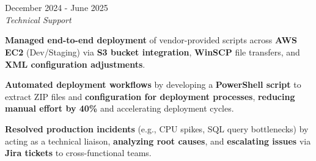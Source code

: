 \documentclass[../main.tex]{subfiles}
\begin{document}
\section{}

\begin{twocolentry}{December 2024 - June 2025}
     \\
    \vspace{0.10 cm}
    \textit{Technical Support}
\end{twocolentry}

\vspace{0.10 cm}
\begin{onecolentry}
\begin{highlights}
    \item \textbf{Managed end-to-end deployment} of vendor-provided scripts across \textbf{AWS EC2} (Dev/Staging) via \textbf{S3 bucket integration}, \textbf{WinSCP} file transfers, and \textbf{XML configuration adjustments}.
    \item \textbf{Automated deployment workflows} by developing a \textbf{PowerShell script} to extract ZIP files and \textbf{configuration for deployment processes}, \textbf{reducing manual effort by 40\%} and accelerating deployment cycles.
    \item \textbf{Resolved production incidents} (e.g., CPU spikes, SQL query bottlenecks) by acting as a technical liaison, \textbf{analyzing root causes}, and \textbf{escalating issues} via \textbf{Jira tickets} to cross-functional teams.
\end{highlights}
\end{onecolentry}
\end{document}
